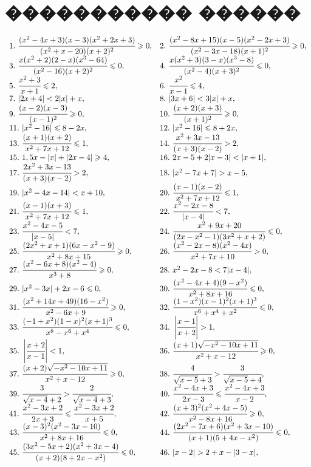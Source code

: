 \documentclass[12pt]{article}
\begin{document}
\section{����������� ������}
$\begin{array}{ll}
1.\ \cfrac{(x^2-4x+3)(x-3)(x^2+2x+3)}{(x^2+x-20)(x+2)^2}\geqslant0,&
2.\ \cfrac{(x^2-8x+15)(x-5)(x^2-2x+3)}{(x^2-3x-18)(x+1)^2}\geqslant0,\\
3.\ \cfrac{x(x^2+2)(2-x)(x^3-64)}{(x^2-16)(x+2)^2}\leqslant 0,&
4.\ \cfrac{x(x^2+3)(3-x)(x^3-8)}{(x^2-4)(x+3)^2}\leqslant 0,\\
5.\ \cfrac{x^2+3}{x+1}\leqslant2,&
6.\ \cfrac{x^2}{x-1}\leqslant4,\\
7.\ |2x+4|<2|x|+x,&
8.\ |3x+6|<3|x|+x,\\
9.\ \cfrac{(x-2)(x-3)}{(x-1)^2}\geqslant0,&
10.\ \cfrac{(x+2)(x+3)}{(x+1)^2}\geqslant0,\\
11.\ |x^2-16|\leqslant8-2x,&
12.\ |x^2-16|\leqslant8+2x,\\
13.\ \cfrac{(x+1)(x+2)}{x^2+7x+12}\leqslant1,&
14.\ \cfrac{x^2+3x-13}{(x+3)(x-2)}>2,\\
15.\ 1,5x-|x|+|2x-4|\geqslant4,&
16.\ 2x-5+2|x-3|<|x+1|,\\
17.\ \cfrac{2x^2+3x-13}{(x+3)(x-2)}>2,&
18.\ |x^2-7x+7|>x-5,\\
19.\ |x^2-4x-14|<x+10,&
20.\ \cfrac{(x-1)(x-2)}{x^2+7x+12}\leqslant1,\\
21.\ \cfrac{(x-1)(x+3)}{x^2+7x+12}\leqslant1,&
22.\ \cfrac{x^2-2x-8}{|x-4|}<7,\\
23.\ \cfrac{x^2-4x-5}{|x-5|}<7,&
24.\ \cfrac{x^2+9x+20}{(2x-x^2-1)(3x^2+x+2)}\leqslant0,\\
25.\ \cfrac{(2x^2+x+1)(6x-x^2-9)}{x^2+8x+15}\geqslant0,&
26.\ \cfrac{(x^2-2x-8)(x^2-4x)}{x^2+7x+10}>0,\\
27.\ \cfrac{(x^2-6x+8)(x^2-4)}{x^3+8}\geqslant0,&
28.\ x^2-2x-8<7|x-4|,\\
29.\ |x^2-3x|+2x-6\leqslant0,&
30.\ \cfrac{(x^2-4x+4)(9-x^2)}{x^2+8x+16}\leqslant0,\\
31.\ \cfrac{(x^2+14x+49)(16-x^2)}{x^2-6x+9}\geqslant0,&
32.\ \cfrac{(1-x^2)(x-1)^2(x+1)^3}{x^6+x^4+x^2}\leqslant0,\\
33.\ \cfrac{(-1+x^2)(1-x)^2(x+1)^3}{x^8-x^6+x^4}\leqslant0,&
34.\ \left|\cfrac{x-1}{x+2}\right|>1,\\
35.\ \left|\cfrac{x+2}{x-1}\right|<1,&
36.\ \cfrac{(x+1)\sqrt{-x^2-10x+11}}{x^2+x-12}\geqslant0,\\
37.\ \cfrac{(x+2)\sqrt{-x^2-10x+11}}{x^2+x-12}\geqslant0,&
38.\ \cfrac{4}{\sqrt{x-5}+3}>\cfrac{3}{\sqrt{x-5}+4},\\
39.\ \cfrac{3}{\sqrt{x-4}+2}>\cfrac{2}{\sqrt{x-4}+3},&
40.\ \cfrac{x^2-4x+3}{2x-3}\leqslant\cfrac{x^2-4x+3}{x-2},\\
41.\ \cfrac{x^2-3x+2}{2x+3}\leqslant\cfrac{x^2-3x+2}{x+5},&
42.\ \cfrac{(x+3)^2(x^2+4x-5)}{x^2-8x+16}\geqslant0,\\
43.\ \cfrac{(x-3)^2(x^2-3x-10)}{x^2+8x+16}\leqslant0,&
44.\ \cfrac{(2x^2-7x+6)(x^2+3x-10)}{(x+1)(5+4x-x^2)}\leqslant0,\\
45.\ \cfrac{(3x^2-5x+2)(x^2+3x-4)}{(x+2)(8+2x-x^2)}\leqslant0,&
46.\ |x-2|>2+x-|3-x|,\end{array}$\\
\end{document}
